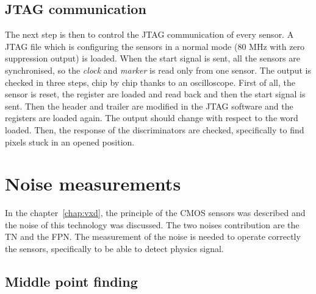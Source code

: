   \subsection{JTAG communication}
  
  The next step is then to control the JTAG communication of every sensor.
  A JTAG file which is configuring the sensors in a normal mode (80 MHz with zero suppression output) is loaded.
  When the start signal is sent, all the sensors are synchronised, so the \textit{clock} and \textit{marker} is read only from one sensor.
  The output is checked in three steps, chip by chip thanks to an oscilloscope.
  First of all, the sensor is reset, the register are loaded and read back and then the start signal is sent. 
  Then the header and trailer are modified in the JTAG software and the registers are loaded again.
  The output should change with respect to the word loaded.
  Then, the response of the discriminators are checked, specifically to find pixels stuck in an opened position.


\section{Noise measurements}

  In the chapter~\ref{chap:vxd}, the principle of the \gls{CMOS} sensors was described and the noise of this technology was discussed.
  The two noises contribution are the \acrfull{TN} and the \acrfull{FPN}.
  The measurement of the noise is needed to operate correctly the sensors, specifically to be able to detect physics signal. 

  \subsection{Middle point finding}

